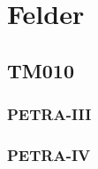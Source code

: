 \chapter{Felder}
\label{sec:appendix_felder}

\section{TM010}
\label{sec:appendix_felder}

\subsection{PETRA-III}

\subsection{PETRA-IV}
